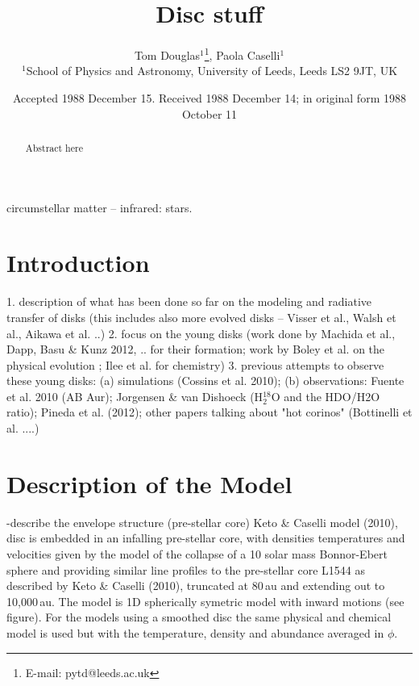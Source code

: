 \documentclass[useAMS,usenatbib]{mn2e}
\title[Disc stuff]{Disc stuff}
\author[Tom  Douglas, Paola Caselli]{Tom Douglas$^{1}$\thanks{E-mail:
pytd@leeds.ac.uk}, Paola Caselli$^{1}$\\
$^{1}$School of Physics and Astronomy, University of Leeds, Leeds LS2 9JT, UK}
\begin{document}
\date{Accepted 1988 December 15. Received 1988 December 14; in original form 1988 October 11}

\pagerange{\pageref{firstpage}--\pageref{lastpage}} 

\maketitle

\label{firstpage}

\begin{abstract}
Abstract here
\end{abstract}

\begin{keywords}
circumstellar matter -- infrared: stars.
\end{keywords}

\section{Introduction}

1. description of what has been done so far on the modeling and radiative transfer of disks (this includes also more evolved disks -- Visser et al., Walsh et al., Aikawa et al. ..)
2. focus on the young disks (work done by Machida et al., Dapp, Basu \& Kunz 2012, .. for their formation; work by Boley et al. on the physical evolution ; Ilee et al. for chemistry) 
3. previous attempts to observe these young disks: (a) simulations (Cossins et al. 2010); (b) observations: Fuente et al. 2010 (AB Aur); Jorgensen \& van Dishoeck (H$_2^{18}$O and the HDO/H2O ratio); Pineda et al. (2012); other papers talking about "hot corinos" (Bottinelli et al. ....)

\section{Description of the Model}

-describe the envelope structure (pre-stellar core)
Keto \& Caselli model (2010), disc is embedded in an infalling pre-stellar core, with densities temperatures and velocities given by the model of the collapse of a 10 solar mass Bonnor-Ebert sphere and providing similar line profiles to the pre-stellar core L1544 as described by Keto \& Caselli (2010), truncated at 80$\,$au and extending out to 10,000$\,$au. The model is 1D spherically symetric model with inward motions (see figure).
For the models using a smoothed disc the same physical and chemical model is used but with the temperature, density and abundance averaged in $\phi$.
\end{document}

